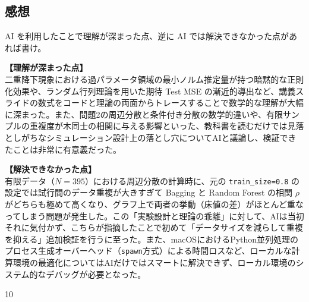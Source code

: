 \documentclass[11pt,a4paper,dvipdfmx]{article}
\numberwithin{equation}{section}
\newenvironment{note}[0]
{
    \begin{tcolorbox}[sharp corners, colframe=gray!20, colback=gray!20, width=\textwidth]
}
{
    \end{tcolorbox}
}
\begin{document}
\subsection*{感想}
\begin{note}
AI を利用したことで理解が深まった点、逆に AI では解決できなかった点があれば書け。
\end{note}
\begin{proofbox}
\textbf{【理解が深まった点】} \\
二重降下現象における過パラメータ領域の最小ノルム推定量が持つ暗黙的な正則化効果や、ランダム行列理論を用いた期待 Test MSE の漸近的導出など、講義スライドの数式をコードと理論の両面からトレースすることで数学的な理解が大幅に深まった。また、問題2の周辺分散と条件付き分散の数学的違いや、有限サンプルの重複度が木同士の相関に与える影響といった、教科書を読むだけでは見落としがちなシミュレーション設計上の落とし穴についてAIと議論し、検証できたことは非常に有意義だった。

\textbf{【解決できなかった点】} \\
有限データ（$N=395$）における周辺分散の計算時に、元の \texttt{train\_size=0.8} の設定では試行間のデータ重複が大きすぎて Bagging と Random Forest の相関 $\rho$ がどちらも極めて高くなり、グラフ上で両者の挙動（床値の差）がほとんど重なってしまう問題が発生した。この「実験設計と理論の乖離」に対して、AIは当初それに気付かず、こちらが指摘したことで初めて「データサイズを減らして重複を抑える」追加検証を行うに至った。また、macOSにおけるPython並列処理のプロセス生成オーバーヘッド（\texttt{spawn}方式）による時間ロスなど、ローカルな計算環境の最適化についてはAIだけではスマートに解決できず、ローカル環境のシステム的なデバッグが必要となった。
\end{proofbox}

\begin{thebibliography}{10}
\end{thebibliography}
\end{document}
